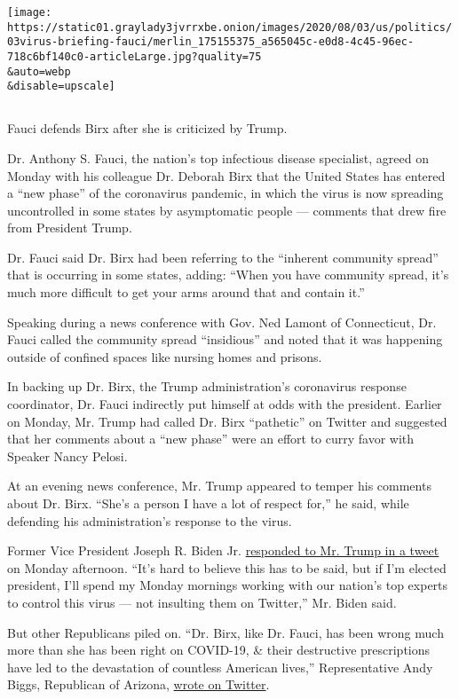 \texttt{[image: https://static01.graylady3jvrrxbe.onion/images/2020/08/03/us/politics/03virus-briefing-fauci/merlin\_175155375\_a565045c-e0d8-4c45-96ec-718c6bf140c0-articleLarge.jpg?quality=75\\\&auto=webp\\\&disable=upscale]}

\subsection{}

Fauci defends Birx after she is criticized by Trump.

Dr. Anthony S. Fauci, the nation's top infectious disease specialist,
agreed on Monday with his colleague Dr. Deborah Birx that the United
States has entered a ``new phase'' of the coronavirus pandemic, in which
the virus is now spreading uncontrolled in some states by asymptomatic
people --- comments that drew fire from President Trump.

Dr. Fauci said Dr. Birx had been referring to the ``inherent community
spread'' that is occurring in some states, adding: ``When you have
community spread, it's much more difficult to get your arms around that
and contain it.''

Speaking during a news conference with Gov. Ned Lamont of Connecticut,
Dr. Fauci called the community spread ``insidious'' and noted that it
was happening outside of confined spaces like nursing homes and prisons.

In backing up Dr. Birx, the Trump administration's coronavirus response
coordinator, Dr. Fauci indirectly put himself at odds with the
president. Earlier on Monday, Mr. Trump had called Dr. Birx ``pathetic''
on Twitter and suggested that her comments about a ``new phase'' were an
effort to curry favor with Speaker Nancy Pelosi.

At an evening news conference, Mr. Trump appeared to temper his comments
about Dr. Birx. ``She's a person I have a lot of respect for,'' he said,
while defending his administration's response to the virus.

Former Vice President Joseph R. Biden Jr.
\href{https://twitter.com/JoeBiden/status/1290350721515139072}{responded
to Mr. Trump in a tweet} on Monday afternoon. ``It's hard to believe
this has to be said, but if I'm elected president, I'll spend my Monday
mornings working with our nation's top experts to control this virus ---
not insulting them on Twitter,'' Mr. Biden said.

But other Republicans piled on. ``Dr. Birx, like Dr. Fauci, has been
wrong much more than she has been right on COVID-19, \& their
destructive prescriptions have led to the devastation of countless
American lives,'' Representative Andy Biggs, Republican of Arizona,
\href{https://twitter.com/RepAndyBiggsAZ/status/1290297517582610433?s=20}{wrote
on Twitter}.

